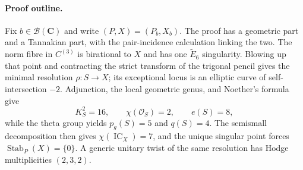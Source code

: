 \documentclass[10pt]{amsart}
\numberwithin{equation}{section}
\theoremstyle{definition}
\theoremstyle{remark}
\newcommand{\CC}{\mathbf C}
\newcommand{\IC}{\operatorname{IC}}
\newcommand{\Stab}{\operatorname{Stab}}
\newcommand{\cB}{\mathcal B}
\newcommand{\wt}{\widetilde}
\begin{document}
\paragraph{Proof outline.}
Fix $b\in\cB(\CC)$ and write $(P,X)=(P_b,X_b)$.  The proof has a geometric
part and a Tannakian part, with the pair-incidence calculation linking the
two.  The norm fibre in $C^{(3)}$ is birational to $X$ and has one
$\wt E_6$ singularity.  Blowing up that point and contracting the strict
transform of the trigonal pencil gives the minimal resolution
$\rho:S\to X$; its exceptional locus is an elliptic curve of
self-intersection $-2$.  Adjunction, the local geometric genus, and Noether's
formula give
\[
 K_S^2=16,\qquad \chi(\mathcal O_S)=2,\qquad e(S)=8,
\]
while the theta group yields $p_g(S)=5$ and $q(S)=4$.  The semismall
decomposition then gives $\chi(\IC_X)=7$, and the unique singular point
forces $\Stab_P(X)=\{0\}$.  A generic unitary twist of the same resolution
has Hodge multiplicities $(2,3,2)$.
\end{document}
